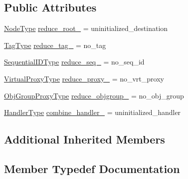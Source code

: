 \subsection*{Public Attributes}
\begin{DoxyCompactItemize}
\item 
\hyperlink{namespacevt_a866da9d0efc19c0a1ce79e9e492f47e2}{Node\+Type} \hyperlink{structvt_1_1collective_1_1reduce_1_1_reduce_msg_a976e38c6642d09d5f171aab8216df6b0}{reduce\+\_\+root\+\_\+} = uninitialized\+\_\+destination
\item 
\hyperlink{namespacevt_a84ab281dae04a52a4b243d6bf62d0e52}{Tag\+Type} \hyperlink{structvt_1_1collective_1_1reduce_1_1_reduce_msg_ae095604d8e87dbd30f0aa0242a624fe8}{reduce\+\_\+tag\+\_\+} = no\+\_\+tag
\item 
\hyperlink{namespacevt_a3063d4db3b879d6dd2c7b8d50995c7f6}{Sequential\+I\+D\+Type} \hyperlink{structvt_1_1collective_1_1reduce_1_1_reduce_msg_a875707afd8d9b7c7925dd8eda8d623e9}{reduce\+\_\+seq\+\_\+} = no\+\_\+seq\+\_\+id
\item 
\hyperlink{namespacevt_a1b417dd5d684f045bb58a0ede70045ac}{Virtual\+Proxy\+Type} \hyperlink{structvt_1_1collective_1_1reduce_1_1_reduce_msg_a12aec73856f05c828d17d17d7178d902}{reduce\+\_\+proxy\+\_\+} = no\+\_\+vrt\+\_\+proxy
\item 
\hyperlink{namespacevt_ad7cae989df485fccca57f0792a880a8e}{Obj\+Group\+Proxy\+Type} \hyperlink{structvt_1_1collective_1_1reduce_1_1_reduce_msg_a193a47361809085ee01211b288e8bb8a}{reduce\+\_\+objgroup\+\_\+} = no\+\_\+obj\+\_\+group
\item 
\hyperlink{namespacevt_af64846b57dfcaf104da3ef6967917573}{Handler\+Type} \hyperlink{structvt_1_1collective_1_1reduce_1_1_reduce_msg_a1265faa9b668a8668148a97f98b75d0d}{combine\+\_\+handler\+\_\+} = uninitialized\+\_\+handler
\end{DoxyCompactItemize}
\subsection*{Additional Inherited Members}


\subsection{Member Typedef Documentation}
\mbox{\label{structvt_1_1collective_1_1reduce_1_1_reduce_msg_a5c736b83ddd821bdce047715e0b606f2}} 
